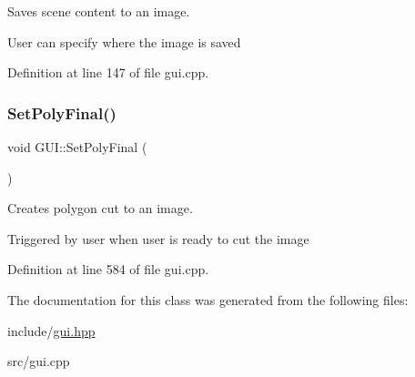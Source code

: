 Saves scene content to an image. 

User can specify where the image is saved 

Definition at line 147 of file gui.\+cpp.

\mbox{\label{classGUI_a6bf2d3ef382340365b5693245a2bd955}} 
\subsubsection{\texorpdfstring{Set\+Poly\+Final()}{SetPolyFinal()}}
{\footnotesize\ttfamily void G\+U\+I\+::\+Set\+Poly\+Final (\begin{DoxyParamCaption}{ }\end{DoxyParamCaption})}



Creates polygon cut to an image. 

Triggered by user when user is ready to cut the image 

Definition at line 584 of file gui.\+cpp.



The documentation for this class was generated from the following files\+:\begin{DoxyCompactItemize}
\item 
include/\mbox{\hyperlink{gui_8hpp}{gui.\+hpp}}\item 
src/gui.\+cpp\end{DoxyCompactItemize}
